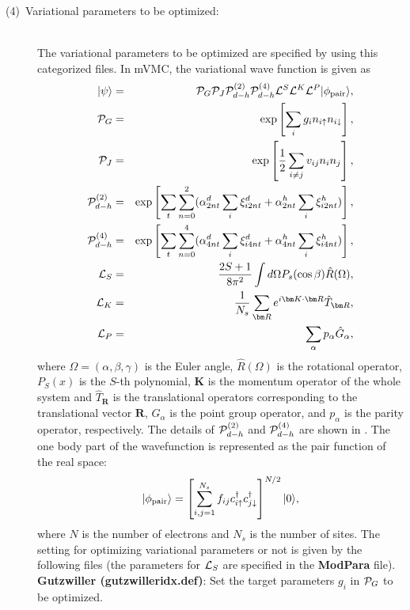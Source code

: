 \begin{description}
\item[(4)~Variational parameters to be optimized:] 
~\\The variational parameters to be optimized are specified by using this categorized files. In mVMC, the variational wave function is given as
\begin{eqnarray}
|\psi \rangle &=& {\cal P}_G{\cal P}_J{\cal P}_{d-h}^{(2)}{\cal P}_{d-h}^{(4)}{\cal L}^S{\cal L}^K{\cal L}^P |\phi_{\rm pair} \rangle,\\
{\cal P}_G&=&\exp\left[ \sum_i g_i n_{i\uparrow} n_{i\downarrow} \right],\\
{\cal P}_J&=&\exp\left[\frac{1}{2} \sum_{i\neq j} v_{ij} n_i n_j\right],\\
{\cal P}_{d-h}^{(2)}&=& \exp \left[ \sum_t \sum_{n=0}^2 (\alpha_{2nt}^d \sum_{i}\xi_{i2nt}^d+\alpha_{2nt}^h \sum_{i}\xi_{i2nt}^h)\right],\\
{\cal P}_{d-h}^{(4)}&=& \exp \left[ \sum_t \sum_{n=0}^4 (\alpha_{4nt}^d \sum_{i}\xi_{i4nt}^d+\alpha_{4nt}^h \sum_{i}\xi_{i4nt}^h)\right],\\
{\cal L}_S&=&\frac{2S+1}{8 \pi^2}\int d\Omega P_s(\cos \beta) \hat{R}(\Omega),\\
{\cal L}_K&=&\frac{1}{N_s}\sum_{{\bm R}}e^{i {\bm K} \cdot{\bm R} } \hat{T}_{\bm R},\\
{\cal L}_P&=&\sum_{\alpha}p_{\alpha} \hat{G}_{\alpha},
\end{eqnarray}
where $\Omega=(\alpha, \beta, \gamma)$ is the Euler angle, $\hat{R}(\Omega)$ is the rotational operator, $P_S(x)$ is the $S$-th polynomial, ${\bm K}$ is the momentum operator of the whole system and $\hat{T}_{\bm R}$ is the translational operators corresponding to the translational vector ${\bm R}$, $\hat{G}_{\alpha}$ is the point group operator, and $p_\alpha$ is the parity operator, respectively. The details of ${\cal P}_{d-h}^{(2)}$ and ${\cal P}_{d-h}^{(4)}$ are shown in \cite{Tahara2008}. The one body part of the wavefunction is represented as the pair function of the real space:
\begin{equation}
|\phi_{\rm pair} \rangle = \left[\sum_{i, j=1}^{N_s} f_{ij}c_{i\uparrow}^{\dag}c_{j\downarrow}^{\dag} \right]^{N/2}|0 \rangle,
\end{equation}
where $N$ is the number of electrons and $N_s$ is the number of sites.
The setting for optimizing variational parameters or not is given by the following files (the parameters for ${\cal L}_S$ are specified in the {\bf ModPara} file).
~\\{\bf Gutzwiller  (gutzwilleridx.def)}: Set the target parameters $g_i$ in ${\cal P}_G$ to be optimized.

\end{description}
